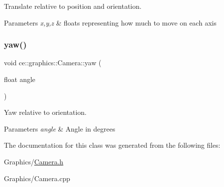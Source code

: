 Translate relative to position and orientation. 


\begin{DoxyParams}{Parameters}
{\em x,y,z} & floats representing how much to move on each axis \\
\hline
\end{DoxyParams}
\mbox{\label{classce_1_1graphics_1_1_camera_ae10a5ea5d64a90f533547f1f6e8ae7ad}} 
\subsubsection{\texorpdfstring{yaw()}{yaw()}}
{\footnotesize\ttfamily void ce\+::graphics\+::\+Camera\+::yaw (\begin{DoxyParamCaption}\item[{float}]{angle }\end{DoxyParamCaption})}



Yaw relative to orientation. 


\begin{DoxyParams}{Parameters}
{\em angle} & Angle in degrees \\
\hline
\end{DoxyParams}


The documentation for this class was generated from the following files\+:\begin{DoxyCompactItemize}
\item 
Graphics/\hyperlink{_camera_8h}{Camera.\+h}\item 
Graphics/Camera.\+cpp\end{DoxyCompactItemize}
